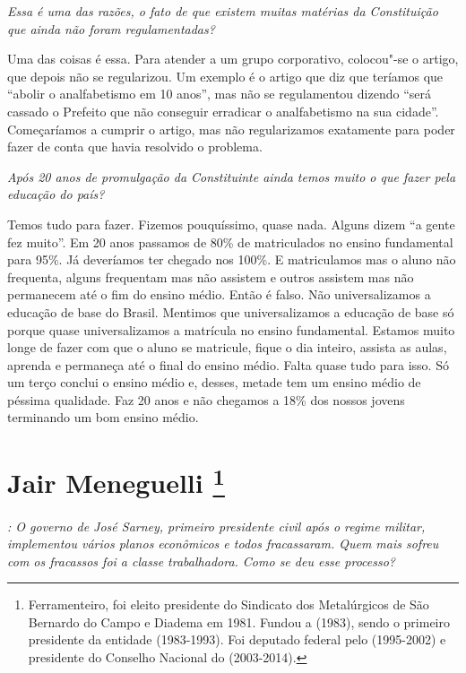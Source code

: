 \medskip

\noindent\emph{Essa é uma das razões, o fato de que existem muitas matérias da
Constituição que ainda não foram regulamentadas?}

Uma das coisas é essa. Para atender a um grupo
corporativo, colocou"-se o artigo, que depois não se regularizou. Um
exemplo é o artigo que diz que teríamos que ``abolir o analfabetismo em
10 anos'', mas não se regulamentou dizendo ``será cassado o Prefeito que
não conseguir erradicar o analfabetismo na sua cidade''. Começaríamos a
cumprir o artigo, mas não regularizamos exatamente para poder fazer de
conta que havia resolvido o problema.

\medskip

\noindent\emph{Após 20 anos de promulgação da Constituinte ainda temos muito o
que fazer pela educação do país?}

Temos tudo para fazer. Fizemos pouquíssimo, quase
nada. Alguns dizem ``a gente fez muito''. Em 20 anos passamos de 80\% de
matriculados no ensino fundamental para 95\%. Já deveríamos ter chegado
nos 100\%. E matriculamos mas o aluno não frequenta, alguns frequentam
mas não assistem e outros assistem mas não permanecem até o fim do
ensino médio. Então é falso. Não universalizamos a educação de base do
Brasil. Mentimos que universalizamos a educação de base só porque quase
universalizamos a matrícula no ensino fundamental. Estamos muito longe
de fazer com que o aluno se matricule, fique o dia inteiro, assista as
aulas, aprenda e permaneça até o final do ensino médio. Falta quase tudo
para isso. Só um terço conclui o ensino médio e, desses, metade tem um
ensino médio de péssima qualidade. Faz 20 anos e não chegamos a 18\% dos
nossos jovens terminando um bom ensino médio.

\chapter{Jair Meneguelli
\footnote{Ferramenteiro, foi eleito presidente do Sindicato dos Metalúrgicos de
São Bernardo do Campo e Diadema em 1981. Fundou a  (1983), sendo o
primeiro presidente da entidade (1983-1993). Foi deputado federal pelo
 (1995-2002) e presidente do Conselho Nacional do  (2003-2014).}}

\emph{: O governo de José Sarney, primeiro presidente civil após o
regime militar, implementou vários planos econômicos e todos
fracassaram. Quem mais sofreu com os fracassos foi a classe
trabalhadora. Como se deu esse processo?}

